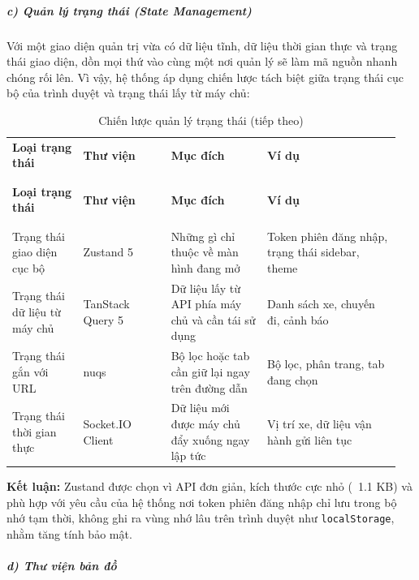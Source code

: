 \documentclass[a4paper]{extarticle}
\newcommand{\thesissettableid}[2]{%
  \renewcommand{\thetable}{#1}%
  \renewcommand{\theHtable}{#2}%
}
\begin{document}
\subparagraph{c) Quản lý trạng thái (State
Management)}\label{c-quux1ea3n-luxfd-trux1ea1ng-thuxe1i-state-management}

Với một giao diện quản trị vừa có dữ liệu tĩnh, dữ liệu thời gian thực và trạng
thái giao diện, dồn mọi thứ vào cùng một nơi quản lý sẽ làm mã nguồn
nhanh chóng rối lên. Vì vậy, hệ thống áp dụng chiến lược tách biệt giữa
trạng thái cục bộ của trình duyệt và trạng thái lấy từ máy chủ:


{\thesissettableid{3.25}{tab-ch3-chien-luoc-quan-ly-trang-thai}
\def\LTcaptype{table}
\begin{longtable}{|L{0.177\linewidth}|L{0.215\linewidth}|L{0.235\linewidth}|L{0.327\linewidth}|}
\caption{Chiến lược quản lý trạng thái}\label{tab:ch3-chien-luoc-quan-ly-trang-thai}\\
\hline \textbf{Loại trạng thái} & \textbf{Thư viện} & \textbf{Mục đích} & \textbf{Ví dụ} \\
\\\hline
\endfirsthead
\caption[]{Chiến lược quản lý trạng thái (tiếp theo)}\\
\hline \textbf{Loại trạng thái} & \textbf{Thư viện} & \textbf{Mục đích} & \textbf{Ví dụ} \\
\\\hline
\endhead
\\\hline
\endfoot
\endlastfoot
Trạng thái giao diện cục bộ & Zustand 5 & Những gì chỉ thuộc về màn hình
đang mở & Token phiên đăng nhập, trạng thái sidebar, theme \\\hline
Trạng thái dữ liệu từ máy chủ & TanStack Query 5 & Dữ liệu lấy từ API
phía máy chủ và cần tái sử dụng & Danh sách xe, chuyến đi, cảnh báo \\\hline
Trạng thái gắn với URL & nuqs & Bộ lọc hoặc tab cần giữ lại ngay trên
đường dẫn & Bộ lọc, phân trang, tab đang chọn \\\hline
Trạng thái thời gian thực & Socket.IO Client & Dữ liệu mới được máy chủ
đẩy xuống ngay lập tức & Vị trí xe, dữ liệu vận hành gửi liên tục \\\hline
\end{longtable}
}


\textbf{Kết luận:} Zustand được chọn vì API đơn giản, kích thước cực nhỏ
(~1.1 KB) và phù hợp với yêu cầu của hệ thống nơi token
phiên đăng nhập chỉ lưu trong bộ nhớ tạm thời, không ghi ra
vùng nhớ lâu trên trình duyệt như \texttt{localStorage}, nhằm tăng tính bảo mật.

\subparagraph{d) Thư viện bản
đồ}\label{d-thux1b0-viux1ec7n-bux1ea3n-ux111ux1ed3}
\end{document}
